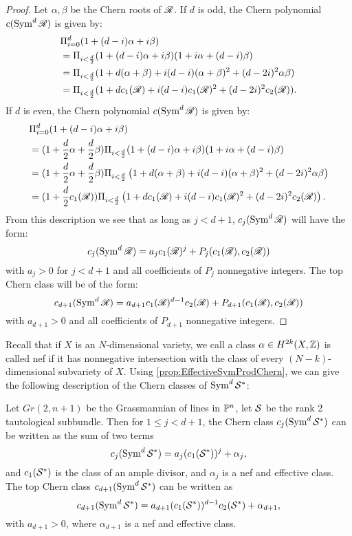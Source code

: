 \begin{proof}
	Let $\alpha,\beta$ be the Chern roots of $\sR$. If $d$ is odd, the Chern polynomial $c(\Sym^d \sR)$ is given by:
	\begin{align*}
		&\product_{i=0}^d (1+(d-i)\alpha + i\beta) \\
		&= \product_{i<\frac{d}{2}} (1+(d-i)\alpha+i\beta)(1+i\alpha + (d-i)\beta) \\
		&= \product_{i<\frac{d}{2}} (1 + d(\alpha + \beta) + i(d-i)(\alpha + \beta)^2 + (d-2i)^2 \alpha \beta)\\
		&= \product_{i<\frac{d}{2}} (1 + dc_1(\sR) + i(d-i) c_1(\sR)^2 + (d-2i)^2 c_2(\sR)).
	\end{align*}
	If $d$ is even, the Chern polynomial  $c(\Sym^d \sR)$ is given by:
	\begin{align*}
		&\product_{i=0}^d (1+(d-i)\alpha + i\beta)\\
		&= (1+\frac{d}{2} \alpha + \frac{d}{2}\beta )\product_{i<\frac{d}{2}} (1+(d-i)\alpha+i\beta)(1+i\alpha + (d-i)\beta)\\
		&= (1+\frac{d}{2} \alpha + \frac{d}{2}\beta ) \product_{i<\frac{d}{2}} \left( 1 + d(\alpha + \beta) + i(d-i)(\alpha + \beta)^2 + (d-2i)^2 \alpha \beta \right) \\
		&= (1+\frac{d}{2} c_1(\sR) )\product_{i<\frac{d}{2}} \left( 1 + dc_1(\sR) + i(d-i) c_1(\sR)^2 + (d-2i)^2 c_2(\sR) \right).
	\end{align*}
	From this description we see that as long as $j < d+1$, $c_j(\Sym^d\sR)$ will have the form:
	\[c_j(\Sym^d \sR) = a_j c_1(\sR)^j + P_j(c_1(\sR),c_2(\sR)) \]
	with $a_j > 0$ for $j < d+1$ and all coefficients of $P_j$ nonnegative integers. The top Chern class will be of the form:
	\[c_{d+1}(\Sym^d \sR) = a_{d+1} c_1(\sR)^{d-1}c_2(\sR) + P_{d+1}(c_1(\sR),c_2(\sR))\]
	with $a_{d+1} > 0$ and all coefficients of $P_{d+1}$ nonnegative integers.
\end{proof}

Recall that if $X$ is an $N$-dimensional variety, we call a class $\alpha \in H^{2k}(X,\Z)$ is called nef if it has nonnegative intersection with the class of every $(N-k)$-dimensional subvariety of $X$. Using \cref{prop:EffectiveSymProdChern}, we can give the following description of the Chern classes of $\Sym^d \sS^*$:
\begin{lemma}
	\label{prop:SubbundleChernClasses}
	Let $Gr(2,n+1)$ be the Grassmannian of lines in $\P^n$, let $\sS$ be the rank 2 tautological subbundle. Then for $1 \leq j < d+1$, the Chern class $c_j(\Sym^d \sS^*)$ can be written as the sum of two terms
\[c_j(\Sym^d \sS^*) = a_{j}(c_1(\sS^*))^j + \alpha_j, \]
and $c_1(\sS^*)$ is the class of an ample divisor, and $\alpha_j$ is a nef and effective class. The top Chern class $c_{d+1}(\Sym^d \sS^*)$ can be written as
\[c_{d+1}(\Sym^d \sS^*) = a_{d+1}(c_1(\sS^*))^{d-1}c_2(\sS^*) + \alpha_{d+1}, \]
with $a_{d+1} > 0$, where $\alpha_{d+1}$ is a nef and effective class. 
\end{lemma}


